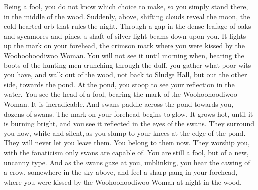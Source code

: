 Being a fool, you do not know which choice to make, so you simply stand there, in the middle of the wood. Suddenly, above, shifting clouds reveal the moon, the cold-hearted orb that rules the night. Through a gap in the dense leafage of oaks and sycamores and pines, a shaft of silver light beams down upon you. It lights up the mark on your forehead, the crimson mark where you were kissed by the Woohoohoodiwoo Woman. You will not see it until morning when, hearing the boots of the hunting men crunching through the duff, you gather what poor wits you have, and walk out of the wood, not back to Sludge Hall, but out the other side, towards the pond. At the pond, you stoop to see your reflection in the water. You see the head of a fool, bearing the mark of the Woohoohoodiwoo Woman. It is ineradicable. And swans paddle across the pond towards you, dozens of swans. The mark on your forehead begins to glow. It grows hot, until it is burning bright, and you see it reflected in the eyes of the swans. They surround you now, white and silent, as you slump to your knees at the edge of the pond. They will never let you leave them. You belong to them now. They worship you, with the fanaticism only swans are capable of. You are still a fool, but of a new, uncanny type. And as the swans gaze at you, unblinking, you hear the cawing of a crow, somewhere in the sky above, and feel a sharp pang in your forehead, where you were kissed by the Woohoohoodiwoo Woman at night in the wood.